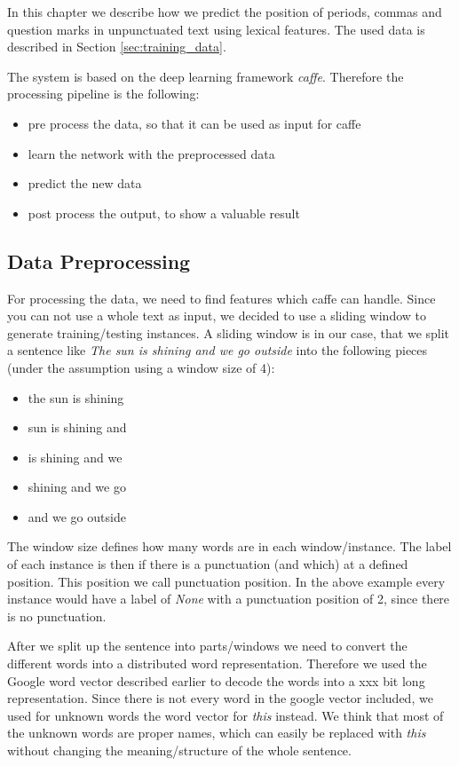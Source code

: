 In this chapter we describe how we predict the position of periods, commas and question marks in unpunctuated text using lexical features.
The used data is described in Section \ref{sec:training_data}. 

The system is based on the deep learning framework \emph{caffe}.
Therefore the processing pipeline is the following:

\begin{itemize}
\item pre process the data, so that it can be used as input for caffe
\item learn the network with the preprocessed data
\item predict the new data
\item post process the output, to show a valuable result
\end{itemize}

\subsection{Data Preprocessing}

For processing the data, we need to find features which caffe can handle. 
Since you can not use a whole text as input, we decided to use a sliding window to generate training/testing instances.
A sliding window is in our case, that we split a sentence like \emph{The sun is shining and we go outside} into the following pieces (under the assumption using a window size of 4):
\begin{itemize}
\item the sun is shining
\item sun is shining and
\item is shining and we
\item shining and we go
\item and we go outside
\end{itemize}

The window size defines how many words are in each window/instance.
The label of each instance is then if there is a punctuation (and which) at a defined position. 
This position we call punctuation position.
In the above example every instance would have a label of \emph{None} with a punctuation position of 2, since there is no punctuation.

After we split up the sentence into parts/windows we need to convert the different words into a distributed word representation.
Therefore we used the Google word vector described earlier to decode the words into a xxx bit long representation. 
Since there is not every word in the google vector included, we used for unknown words the word vector for \emph{this} instead. 
We think that most of the unknown words are proper names, which can easily be replaced with \emph{this} without changing the meaning/structure of the whole sentence.

